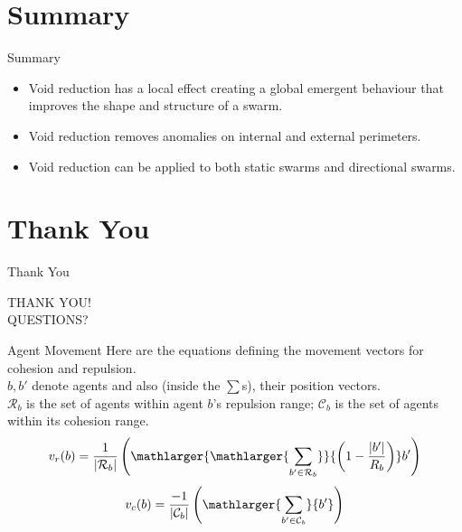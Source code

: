 \documentclass{beamer}
\newcommand{\card}[1]{\vert{#1}\vert}
\newcommand{\magn}[1]{\vert{#1}\vert}
\begin{document}
\section*{Summary}

\begin{frame}{Summary}
  \begin{itemize}
  \item
    \alert{Void reduction} has a local effect creating a global emergent behaviour that improves the shape and structure of a swarm.
  \item
    \alert{Void reduction} removes anomalies on internal and external perimeters.
  \item
    \alert{Void reduction} can be applied to both static swarms and directional swarms.
  \end{itemize}
\end{frame}

\section*{Thank You}

\begin{frame}{Thank You}
  \begin{center}
  THANK YOU!\\
  QUESTIONS?
  \end{center}
\end{frame}


\begin{frame}{Agent Movement}
Here are the equations defining the movement vectors for cohesion and repulsion. \\$b, b'$ denote agents and also (inside the $\sum$s), their position vectors. \\$\mathcal R_b$ is the set of agents within agent $b$'s repulsion range; $\mathcal C_b$ is the set of agents within its cohesion range.
  \begin{equation}\label{eq:Repulsion1}
    v_r(b) = 
    \frac{1}{\card{\mathcal R_b}}
    \left(
      \mathlarger{\mathlarger{\sum_{b' \in \mathcal R_b}}}
      {\left( 1-\frac{\magn{b'}}{R_b} \right)}
      b'
    \right)
    \end{equation}
    \begin{equation}\label{eq:FlyToCentre1}
      v_c(b) =
      \frac{-1}{\card{\mathcal C_b}}\left({\mathlarger{\sum_{b' \in
      \mathcal C_b}}{b'}}\right)
    \end{equation}
\end{frame}
\end{document}

